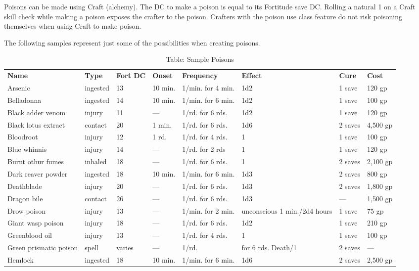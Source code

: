 Poisons can be made using Craft (alchemy). The DC to make a poison is equal to its Fortitude save DC. Rolling a natural 1 on a Craft skill check while making a poison exposes the crafter to the poison. Crafters with the poison use class feature do not risk poisoning themselves when using Craft to make poison.
				
The following samples represent just some of the possibilities when creating poisons.
				

\begin{table*}[]
\sffamily
\caption{Table: Sample Poisons}
\begin{tabular}{llllllll}
\textbf{Name} & \textbf{Type} & \textbf{Fort DC} & \textbf{Onset} & \textbf{Frequency} & \textbf{Effect} & \textbf{Cure} & \textbf{Cost}\\
Arsenic & ingested & 13 & 10 min. & 1/min. for 4 min. & 1d2  & 1 save & 120 gp\\
Belladonna & ingested & 14 & 10 min. & 1/min. for 6 min. & 1d2  & 1 save & 100 gp\\
Black adder venom & injury & 11 & --- & 1/rd. for 6 rds. & 1d2  & 1 save & 120 gp\\
Black lotus extract & contact & 20 & 1 min. & 1/rd. for 6 rds. & 1d6  & 2 saves & 4,500 gp\\
Bloodroot & injury & 12 & 1 rd. & 1/rd. for 4 rds. & 1  & 1 save & 100 gp\\
Blue whinnis & injury & 14 & --- & 1/rd. for 2 rds &  1  & 1 save & 120 gp\\
Burnt othur fumes & inhaled & 18 & --- & 1/rd. for 6 rds. & 1  & 2 saves & 2,100 gp\\
Dark reaver powder & ingested & 18 & 10 min. & 1/min. for 6 min. & 1d3  & 2 saves & 800 gp\\
Deathblade & injury & 20 & --- & 1/rd. for 6 rds. & 1d3  & 2 saves & 1,800 gp\\
Dragon bile & contact & 26 & --- & 1/rd. for 6 rds. & 1d3  & --- & 1,500 gp\\
Drow poison & injury & 13 & --- & 1/min. for 2 min. & unconscious 1 min./2d4 hours & 1 save & 75 gp\\
Giant wasp poison & injury & 18 & --- & 1/rd. for 6 rds. & 1d2  & 1 save & 210 gp\\
Greenblood oil & injury & 13 & --- & 1/rd. for 4 rds. & 1  & 1 save & 100 gp\\
Green prismatic poison & spell & varies & --- & 1/rd. & for 6 rds. Death/1  & 2 saves & ---\\
Hemlock & ingested & 18 & 10 min. & 1/min. for 6 min. & 1d6  & 2 saves & 2,500 gp\\

\end{tabular}
\end{table*}
